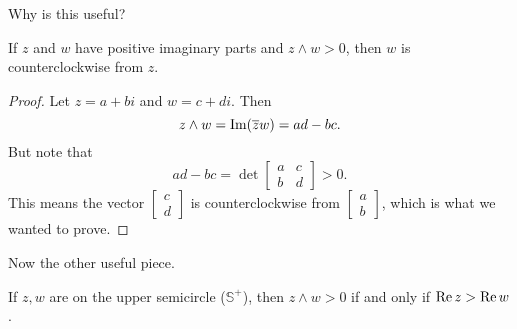 Why is this useful?

\begin{theorem}
    If $z$ and $w$ have positive imaginary parts and 
    $z \wedge w > 0$, then $w$ is counterclockwise from $z$.
\end{theorem}

\begin{proof}
    Let $z = a + bi$ and $w = c + di$.
    Then 
    \[ z \wedge w = \operatorname{Im}(\overline{z}w) = ad - bc. \]
    But note that
    \[ ad - bc = \det \begin{bmatrix} 
                 a & c \\
                 b & d
            \end{bmatrix}
            > 0.
         \]
    This means the vector $\begin{bmatrix} c \\ d \end{bmatrix}$ 
    is counterclockwise from $\begin{bmatrix} a \\ b \end{bmatrix}$, which is what we wanted to prove.
\end{proof}

Now the other useful piece.

\begin{theorem}
    If $z, w$ are on the upper semicircle ($\mathbb{S}^+$),
    then $z \wedge w > 0$ if and only if $\operatorname{Re} z > \operatorname{Re} w$.
\end{theorem}

